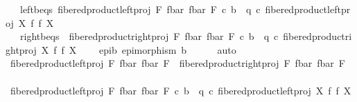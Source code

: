 \begin{isabellebody}
\ \ \ left{\isacharunderscore}{\kern0pt}b{\isacharunderscore}{\kern0pt}eqs{\isacharcolon}{\kern0pt}\ {\isachardoublequoteopen}fibered{\isacharunderscore}{\kern0pt}product{\isacharunderscore}{\kern0pt}left{\isacharunderscore}{\kern0pt}proj\ F\ {\isacharparenleft}{\kern0pt}f{\isacharunderscore}{\kern0pt}bar{\isacharparenright}{\kern0pt}\ {\isacharparenleft}{\kern0pt}f{\isacharunderscore}{\kern0pt}bar{\isacharparenright}{\kern0pt}\ F\ {\isasymcirc}\isactrlsub c\ b\ {\isacharequal}{\kern0pt}\ q\ {\isasymcirc}\isactrlsub c\ fibered{\isacharunderscore}{\kern0pt}product{\isacharunderscore}{\kern0pt}left{\isacharunderscore}{\kern0pt}proj\ X\ f\ f\ X{\isachardoublequoteclose}\ \isanewline
\ \ \ right{\isacharunderscore}{\kern0pt}b{\isacharunderscore}{\kern0pt}eqs{\isacharcolon}{\kern0pt}\ \ {\isachardoublequoteopen}fibered{\isacharunderscore}{\kern0pt}product{\isacharunderscore}{\kern0pt}right{\isacharunderscore}{\kern0pt}proj\ F\ {\isacharparenleft}{\kern0pt}f{\isacharunderscore}{\kern0pt}bar{\isacharparenright}{\kern0pt}\ {\isacharparenleft}{\kern0pt}f{\isacharunderscore}{\kern0pt}bar{\isacharparenright}{\kern0pt}\ F\ {\isasymcirc}\isactrlsub c\ b\ {\isacharequal}{\kern0pt}\ q\ {\isasymcirc}\isactrlsub c\ fibered{\isacharunderscore}{\kern0pt}product{\isacharunderscore}{\kern0pt}right{\isacharunderscore}{\kern0pt}proj\ X\ f\ f\ X{\isachardoublequoteclose}\ \isanewline
\ \ \ epi{\isacharunderscore}{\kern0pt}b{\isacharcolon}{\kern0pt}\ {\isachardoublequoteopen}epimorphism\ b{\isachardoublequoteclose}\isanewline
\ \ \ \ \isamarkupfalse%
\ auto\isanewline
\isanewline
\ \isanewline
\ \ \isamarkupfalse%
\ {\isachardoublequoteopen}fibered{\isacharunderscore}{\kern0pt}product{\isacharunderscore}{\kern0pt}left{\isacharunderscore}{\kern0pt}proj\ F\ {\isacharparenleft}{\kern0pt}f{\isacharunderscore}{\kern0pt}bar{\isacharparenright}{\kern0pt}\ {\isacharparenleft}{\kern0pt}f{\isacharunderscore}{\kern0pt}bar{\isacharparenright}{\kern0pt}\ F\ {\isacharequal}{\kern0pt}\ fibered{\isacharunderscore}{\kern0pt}product{\isacharunderscore}{\kern0pt}right{\isacharunderscore}{\kern0pt}proj\ F\ {\isacharparenleft}{\kern0pt}f{\isacharunderscore}{\kern0pt}bar{\isacharparenright}{\kern0pt}\ {\isacharparenleft}{\kern0pt}f{\isacharunderscore}{\kern0pt}bar{\isacharparenright}{\kern0pt}\ F{\isachardoublequoteclose}\isanewline
\ \ \isamarkupfalse%
\ {\isacharminus}{\kern0pt}\ \isanewline
\ \ \ \ \isamarkupfalse%
\ {\isachardoublequoteopen}{\isacharparenleft}{\kern0pt}fibered{\isacharunderscore}{\kern0pt}product{\isacharunderscore}{\kern0pt}left{\isacharunderscore}{\kern0pt}proj\ F\ {\isacharparenleft}{\kern0pt}f{\isacharunderscore}{\kern0pt}bar{\isacharparenright}{\kern0pt}\ {\isacharparenleft}{\kern0pt}f{\isacharunderscore}{\kern0pt}bar{\isacharparenright}{\kern0pt}\ F{\isacharparenright}{\kern0pt}\ {\isasymcirc}\isactrlsub c\ b\ {\isacharequal}{\kern0pt}\ q\ {\isasymcirc}\isactrlsub c\ fibered{\isacharunderscore}{\kern0pt}product{\isacharunderscore}{\kern0pt}left{\isacharunderscore}{\kern0pt}proj\ X\ f\ f\ X{\isachardoublequoteclose}\isanewline

\end{isabellebody}
